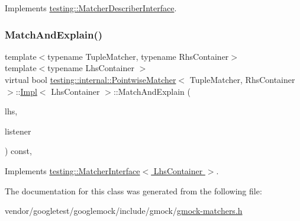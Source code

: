 Implements \hyperlink{classtesting_1_1_matcher_describer_interface_ad9f861588bd969b6e3e717f13bb94e7b}{testing\+::\+Matcher\+Describer\+Interface}.

\mbox{\label{classtesting_1_1internal_1_1_pointwise_matcher_1_1_impl_a4253946989f3743c4dd983909f2d062b}} 
\subsubsection{\texorpdfstring{Match\+And\+Explain()}{MatchAndExplain()}}
{\footnotesize\ttfamily template$<$typename Tuple\+Matcher, typename Rhs\+Container$>$ \\
template$<$typename Lhs\+Container $>$ \\
virtual bool \hyperlink{classtesting_1_1internal_1_1_pointwise_matcher}{testing\+::internal\+::\+Pointwise\+Matcher}$<$ Tuple\+Matcher, Rhs\+Container $>$\+::\hyperlink{classtesting_1_1internal_1_1_pointwise_matcher_1_1_impl}{Impl}$<$ Lhs\+Container $>$\+::Match\+And\+Explain (\begin{DoxyParamCaption}\item[{Lhs\+Container}]{lhs,  }\item[{\hyperlink{classtesting_1_1_match_result_listener}{Match\+Result\+Listener} $\ast$}]{listener }\end{DoxyParamCaption}) const\hspace{0.3cm}{\ttfamily [inline]}, {\ttfamily [virtual]}}



Implements \hyperlink{classtesting_1_1_matcher_interface_a296b43607cd99d60365f0e6a762777cf}{testing\+::\+Matcher\+Interface$<$ Lhs\+Container $>$}.



The documentation for this class was generated from the following file\+:\begin{DoxyCompactItemize}
\item 
vendor/googletest/googlemock/include/gmock/\hyperlink{gmock-matchers_8h}{gmock-\/matchers.\+h}\end{DoxyCompactItemize}
